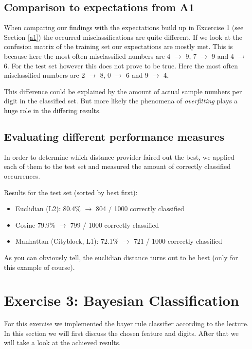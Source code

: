 \documentclass{article}
\begin{document}
\subsection{Comparison to expectations from A1}
When comparing our findings with the expectations build up in Excercise 1 (see Section \ref{a1}) the occurred misclassifications are quite different.
If we look at the confusion matrix of the training set our expectations are mostly met. This is because here the  most often misclassified numbers are 4 $\rightarrow$ 9, 7 $\rightarrow$ 9 and 4 $\rightarrow$ 6.
For the test set however this does not prove to be true. Here the most often misclassified numbers are 2 $\rightarrow$ 8, 0 $\rightarrow$ 6 and 9 $\rightarrow$ 4.

This difference could be explained by the amount of actual sample numbers per digit in the classified set.
But more likely the phenomena of \emph{overfitting} plays a huge role in the differing results.

\subsection{Evaluating different performance measures}
In order to determine which distance provider faired out the best, we applied each of them to the test set and measured the amount of correctly classified occurrences.

Results for the test set (sorted by best first):
\begin{itemize}
\item Euclidian (L2): 80.4\% $\rightarrow$ 804 / 1000 correctly classified
\item Cosine 79.9\% $\rightarrow$ 799 / 1000 correctly classified
\item Manhattan (Cityblock, L1): 72.1\% $\rightarrow$ 721 / 1000 correctly classified
\end{itemize}

As you can obviously tell, the euclidian distance turns out to be best (only for this example of course).

\section{Exercise 3: Bayesian Classification}
For this exercise we implemented the bayer rule classifier according to the lecture. In this section we will first discuss the chosen feature and digits.
After that we will take a look at the achieved results.
\end{document}
